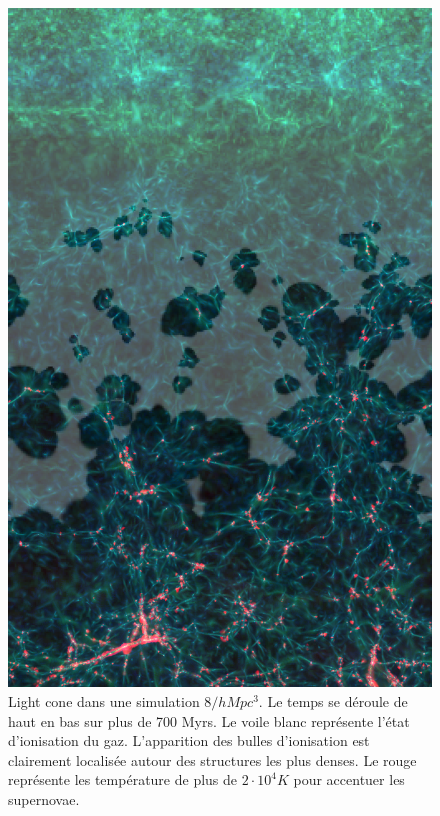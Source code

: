 \begin{figure}
        \includegraphics[height=.90\textheight]{img/04/frise_wall.png} 
        \caption[Light cone]{Light cone dans une simulation $8/h Mpc ^3$. 
        Le temps se déroule de haut en bas sur plus de 700 Myrs.
        Le voile blanc représente l'état d'ionisation du gaz.
        L'apparition des bulles d'ionisation est clairement localisée autour des structures les plus denses.
        Le rouge représente les température de plus de $2\cdot 10^4K$ pour accentuer les supernovae. 
 }
 		\label{fig:lightcone}
\end{figure}

